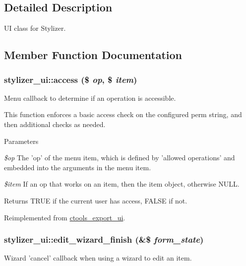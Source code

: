 \subsection{Detailed Description}
UI class for Stylizer. 

\subsection{Member Function Documentation}
\hypertarget{classstylizer__ui_ae2cd136304d22ed167dcb660f03b2bbf}{
\subsubsection[{access}]{\setlength{\rightskip}{0pt plus 5cm}stylizer\_\-ui::access (\$ {\em op}, \/  \$ {\em item})}}
\label{classstylizer__ui_ae2cd136304d22ed167dcb660f03b2bbf}
Menu callback to determine if an operation is accessible.

This function enforces a basic access check on the configured perm string, and then additional checks as needed.


\begin{DoxyParams}{Parameters}
\item[{\em \$op}]The 'op' of the menu item, which is defined by 'allowed operations' and embedded into the arguments in the menu item. \item[{\em \$item}]If an op that works on an item, then the item object, otherwise NULL.\end{DoxyParams}
\begin{DoxyReturn}{Returns}
TRUE if the current user has access, FALSE if not. 
\end{DoxyReturn}


Reimplemented from \hyperlink{classctools__export__ui_a2969ae536055dec201470f76f107450b}{ctools\_\-export\_\-ui}.\hypertarget{classstylizer__ui_a1427eae1e6f77718b123dc9d74f335c2}{
\subsubsection[{edit\_\-wizard\_\-finish}]{\setlength{\rightskip}{0pt plus 5cm}stylizer\_\-ui::edit\_\-wizard\_\-finish (\&\$ {\em form\_\-state})}}
\label{classstylizer__ui_a1427eae1e6f77718b123dc9d74f335c2}
Wizard 'cancel' callback when using a wizard to edit an item.

